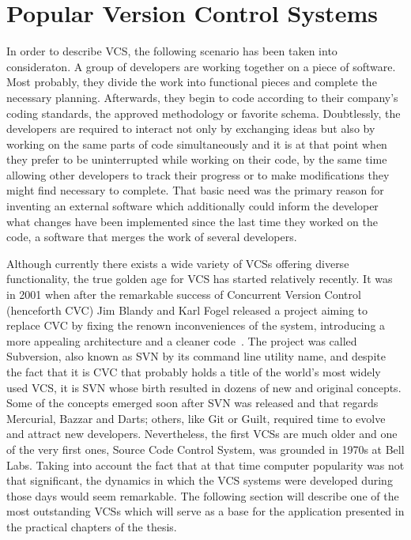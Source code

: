\section{Popular Version Control Systems}\label{sec:popular_vcs}
In order to describe VCS, the following scenario has been taken into consideraton. A group of developers are working together on a piece of software. Most probably, they divide the work into functional pieces and complete the necessary planning. Afterwards, they begin to code according to their company's coding standards, the approved methodology or favorite schema. Doubtlessly, the developers are required to interact not only by exchanging ideas but also by working on the same parts of code simultaneously and it is at that point when they prefer to be uninterrupted while working on their code, by the same time allowing other developers to track their progress or to make modifications they might find necessary to complete. That basic need was the primary reason for inventing an external software which additionally could inform the developer what changes have been implemented since the last time they worked on the code, a software that merges the work of several developers. 

Although currently there exists a wide variety of VCSs offering diverse functionality, the true golden age for VCS has started relatively recently. It was in 2001 when after the remarkable success of Concurrent Version Control (henceforth CVC) Jim Blandy and Karl Fogel released a project aiming to replace CVC by fixing the renown inconveniences of the system, introducing a more appealing architecture and a cleaner code~\cite[page 11]{hg_book}. The project was called Subversion, also known as SVN by its command line utility name, and despite the fact that it is CVC that probably holds a title of the world's most widely used VCS, it is SVN whose birth resulted in dozens of new and original concepts. Some of the concepts emerged soon after SVN was released and that regards Mercurial, Bazzar and Darts; others, like Git or Guilt, required time to evolve and attract new developers. Nevertheless, the first VCSs are much older and one of the very first ones, Source Code Control System, was grounded in 1970s at Bell Labs. Taking into account the fact that at that time computer popularity was not that significant, the dynamics in which the VCS systems were developed during those days would seem remarkable. The following section will describe one of the most outstanding VCSs which will serve as a base for the application presented in the practical chapters of the thesis.

